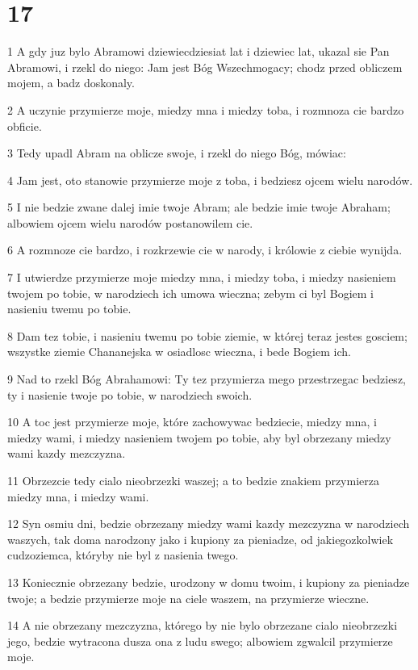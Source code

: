 \chapter{17}

\par 1 A gdy juz bylo Abramowi dziewiecdziesiat lat i dziewiec lat, ukazal sie Pan Abramowi, i rzekl do niego: Jam jest Bóg Wszechmogacy; chodz przed obliczem mojem, a badz doskonaly.
\par 2 A uczynie przymierze moje, miedzy mna i miedzy toba, i rozmnoza cie bardzo obficie.
\par 3 Tedy upadl Abram na oblicze swoje, i rzekl do niego Bóg, mówiac:
\par 4 Jam jest, oto stanowie przymierze moje z toba, i bedziesz ojcem wielu narodów.
\par 5 I nie bedzie zwane dalej imie twoje Abram; ale bedzie imie twoje Abraham; albowiem ojcem wielu narodów postanowilem cie.
\par 6 A rozmnoze cie bardzo, i rozkrzewie cie w narody, i królowie z ciebie wynijda.
\par 7 I utwierdze przymierze moje miedzy mna, i miedzy toba, i miedzy nasieniem twojem po tobie, w narodziech ich umowa wieczna; zebym ci byl Bogiem i nasieniu twemu po tobie.
\par 8 Dam tez tobie, i nasieniu twemu po tobie ziemie, w której teraz jestes gosciem; wszystke ziemie Chananejska w osiadlosc wieczna, i bede Bogiem ich.
\par 9 Nad to rzekl Bóg Abrahamowi: Ty tez przymierza mego przestrzegac bedziesz, ty i nasienie twoje po tobie, w narodziech swoich.
\par 10 A toc jest przymierze moje, które zachowywac bedziecie, miedzy mna, i miedzy wami, i miedzy nasieniem twojem po tobie, aby byl obrzezany miedzy wami kazdy mezczyzna.
\par 11 Obrzezcie tedy cialo nieobrzezki waszej; a to bedzie znakiem przymierza miedzy mna, i miedzy wami.
\par 12 Syn osmiu dni, bedzie obrzezany miedzy wami kazdy mezczyzna w narodziech waszych, tak doma narodzony jako i kupiony za pieniadze, od jakiegozkolwiek cudzoziemca, któryby nie byl z nasienia twego.
\par 13 Koniecznie obrzezany bedzie, urodzony w domu twoim, i kupiony za pieniadze twoje; a bedzie przymierze moje na ciele waszem, na przymierze wieczne.
\par 14 A nie obrzezany mezczyzna, którego by nie bylo obrzezane cialo nieobrzezki jego, bedzie wytracona dusza ona z ludu swego; albowiem zgwalcil przymierze moje.
